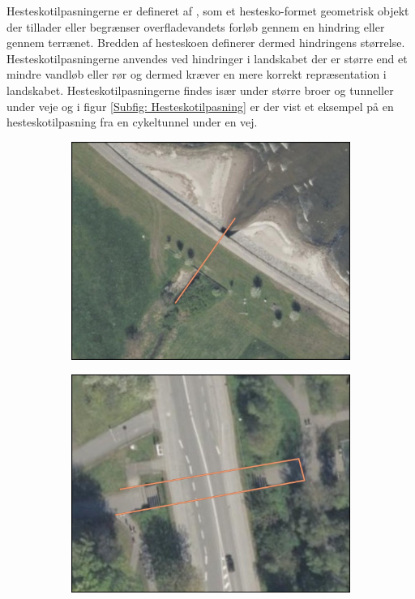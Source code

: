 Hesteskotilpasningerne er defineret af \cite{DHM_Hestesko}, som et hestesko-formet geometrisk objekt der tillader eller begrænser overfladevandets forløb gennem en hindring eller gennem terrænet. Bredden af hesteskoen definerer dermed hindringens størrelse. Hesteskotilpasningerne anvendes ved hindringer i landskabet der er større end et mindre vandløb eller rør og dermed kræver en mere korrekt repræsentation i landskabet. Hesteskotilpasningerne findes især under større broer og tunneller under veje og i figur \ref{Subfig: Hesteskotilpasning} er der vist et eksempel på en hesteskotilpasning fra en cykeltunnel under en vej.
\begin{figure}[H]
    \begin{subfigure}[b]{0.5\textwidth}
        \centering
        \includegraphics[width=1\linewidth]{images/databeskrivelse/linje.jpg}
        \caption{}
        \label{Subfig: Linjetilpasning}
    \end{subfigure}
    \hspace{0.2cm}
    \begin{subfigure}[b]{0.5\textwidth}
        \centering
        \includegraphics[width=1\linewidth]{images/databeskrivelse/hestesko.jpg}

\end{subfigure}
\end{figure}
